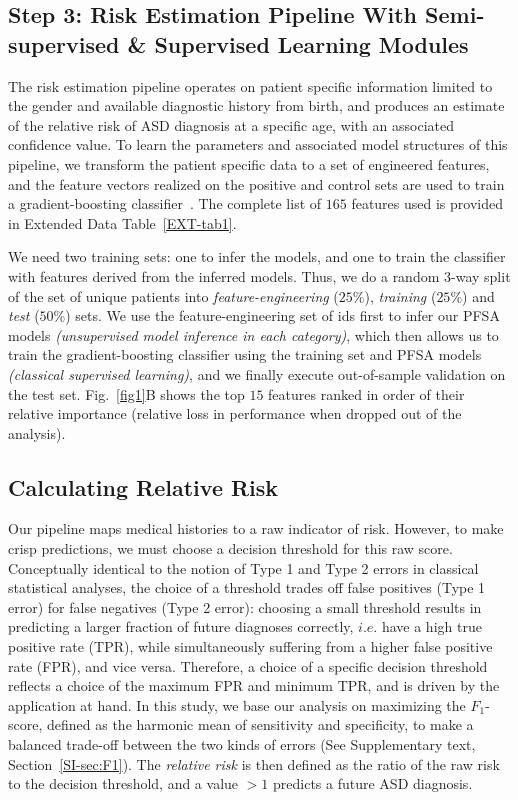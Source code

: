 \documentclass[3p,super,numbers,sort&compress,preprint,10pt]{elsarticle}
\def\treatment{positive\xspace}
\begin{document}
\subsection*{Step 3: Risk Estimation Pipeline With Semi-supervised \& Supervised Learning Modules}
The risk estimation pipeline operates on patient specific information limited to the
gender and available  diagnostic history from birth, and produces an estimate of the relative risk of ASD diagnosis at a specific age, with an associated  confidence value.
To learn the parameters and associated model structures of  this pipeline, we transform the patient specific data to a set of engineered features, and the feature vectors realized on the
\treatment and control sets are  used to train a gradient-boosting classifier~\cite{gbm02}.
The complete list of $165$ features used  is provided in Extended Data Table~\ref{EXT-tab1}.

We need two training sets: one to infer the models, and one to  train the classifier  with features  derived  from the inferred models. Thus, we do a random 3-way split of the set of unique patients into \textit{feature-engineering} ($25\%$), \textit{training} ($25\%$) and \textit{test} ($50\%$) sets. We use the feature-engineering set of ids first to infer our PFSA models \textit{(unsupervised model inference in each category)}, which then allows us to train the gradient-boosting classifier using the training set and PFSA models \textit{(classical supervised learning)}, and we finally execute  out-of-sample validation on the test set. Fig.~\ref{fig1}B shows the top $15$ features  ranked in order of their relative importance (relative loss in performance when dropped out of the analysis). 

\subsection*{Calculating Relative Risk}
Our pipeline maps medical histories to a   raw indicator of 
risk. However, to make crisp predictions, we must choose  a decision threshold for this raw score. Conceptually identical to the notion of Type 1 and Type 2 errors in classical statistical analyses, the choice of a threshold trades off false positives (Type 1 error) for false negatives (Type 2 error): choosing a small threshold  results in predicting a larger fraction of future diagnoses correctly, $i.e.$ have a high true positive rate (TPR), while simultaneously suffering from a higher false positive rate (FPR), and vice versa. Therefore, a choice of a specific decision threshold   reflects a choice of the maximum FPR and minimum TPR, and is   driven by the application at hand. In this study, we base our analysis on maximizing the $F_1$-score, defined as the harmonic mean of sensitivity and specificity, to make a   balanced trade-off between the two kinds of errors
(See Supplementary text, Section~\ref{SI-sec:F1}). The \textit{relative risk} is then defined as the ratio of the raw  risk to the  decision threshold, and a value  $>1$  predicts a future ASD diagnosis.
\end{document}

